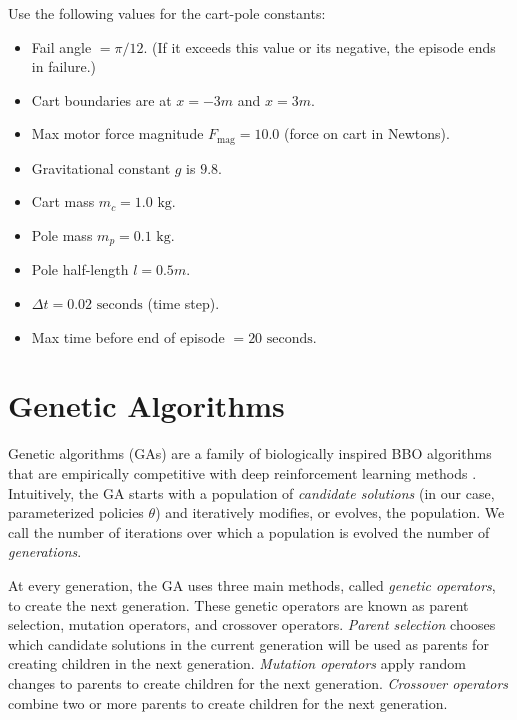 \documentclass[]{article}
\begin{document}
Use the following values for the cart-pole constants:
\begin{itemize}
    \item Fail angle $= \pi/12$. (If it exceeds this value or its negative, the episode ends in failure.)
    \item Cart boundaries are at $x=-3m$ and $x=3m$.
    \item Max motor force magnitude $F_\text{mag} = 10.0$ (force on cart in Newtons).
    \item Gravitational constant $g$ is $9.8$.
    \item Cart mass $m_c = 1.0 \text{ kg}$.
    \item Pole mass $m_p = 0.1 \text{ kg}$.
    \item Pole half-length $l = 0.5m$.
    \item $\Delta t = 0.02\text{ seconds}$ (time step).
    \item Max time before end of episode $= 20\text{ seconds}$.
\end{itemize}

\section*{Genetic Algorithms}
Genetic algorithms (GAs) are a family of biologically inspired BBO algorithms that are empirically competitive with deep reinforcement learning methods \citep{such2017deep}. Intuitively, the GA starts with a population of \emph{candidate solutions} (in our case, parameterized policies $\theta$) and iteratively modifies, or evolves, the population. We call the number of iterations over which a population is evolved the number of \emph{generations}. 

At every generation, the GA uses three main methods, called \emph{genetic operators}, to create the next generation. These genetic operators are known as parent selection, mutation operators, and crossover operators. \emph{Parent selection} chooses which candidate solutions in the current generation will be used as parents for creating children in the next generation.  \emph{Mutation operators} apply random changes to parents to create children for the next generation. \emph{Crossover operators} combine two or more parents to create children for the next generation.
\end{document}
